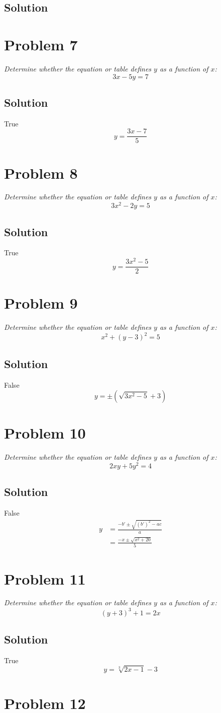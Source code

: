 \documentclass[11pt]{article}
\newcommand{\soln}{\subsection*}
\newcommand{\qn}{\textit}
\begin{document}
\soln{Solution}

\section*{Problem 7}

\qn{Determine whether the equation or table defines $y$ as a function of $x$: $$3x-5y=7$$}

\soln{Solution}
True
$$y=\frac{3x-7}{5}$$

\section*{Problem 8}

\qn{Determine whether the equation or table defines $y$ as a function of $x$: $$3x^2-2y=5$$}

\soln{Solution}
True
$$y=\frac{3x^2-5}{2}$$

\section*{Problem 9}

\qn{Determine whether the equation or table defines $y$ as a function of $x$: $$x^2+(y-3)^2=5$$}

\soln{Solution}
False
$$y=\pm(\sqrt{3x^2-5}+3)$$

\section*{Problem 10}

\qn{Determine whether the equation or table defines $y$ as a function of $x$: $$2xy+5y^2=4$$}

\soln{Solution}
False
\begin{equation*}
	\begin{split}
		y & = \frac{-b'\pm\sqrt{(b')^2-ac}}{a} \\
		  & = \frac{-x\pm\sqrt{x^2+20}}{5}
	\end{split}
\end{equation*}

\section*{Problem 11}

\qn{Determine whether the equation or table defines $y$ as a function of $x$: $$(y+3)^3+1=2x$$}

\soln{Solution}
True
$$y=\sqrt[3]{2x-1}-3$$

\section*{Problem 12}
\end{document}
